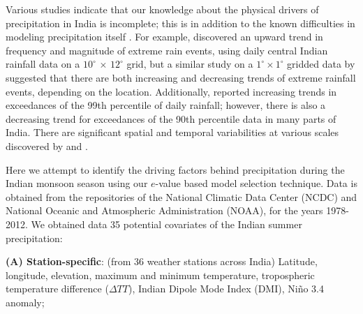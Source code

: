 %
Various  studies indicate that our knowledge about the physical drivers of precipitation in India is incomplete; this is in addition to the known difficulties in modeling precipitation itself \cite{ref:Knuttietal10_JClimate, ref:Trenberth03_BAMS, ref:Wangetal05_GRL, ref:Trenberth11_ClimateResearch}. For example, \cite{goswami} discovered an upward trend in frequency and magnitude of extreme rain events, using daily central Indian rainfall data on a $10^{\circ}$ $\times$ $12^{\circ}$ grid, but a similar study on a $1^{\circ}\times 1^{\circ}$ gridded data by \cite{ghosh2} suggested that there are both increasing and 
decreasing trends of extreme rainfall events, depending on the location. Additionally, \cite{kris} reported increasing trends in exceedances of the 99th percentile of  daily rainfall; however, there is also a decreasing trend for exceedances of the 90th percentile data  in many parts of India. There are significant spatial and temporal variabilities at various scales discovered by \cite{ref:DietzC14} and \cite{ref:DietzC15_ClimateInfo14}.

Here we attempt to identify the driving factors behind precipitation during the Indian monsoon season using our $e$-value based model selection technique. Data is obtained from the repositories of the National Climatic Data Center (NCDC) and National Oceanic and Atmospheric Administration (NOAA), for the years 1978-2012. 
We obtained data 35 potential covariates of the Indian summer precipitation:

\noindent\textbf{(A) Station-specific}: (from 36 weather stations across India) Latitude, longitude, elevation, maximum and minimum temperature, tropospheric temperature difference ($\Delta TT$), Indian Dipole Mode Index (DMI), Ni\~{n}o 3.4 anomaly;

